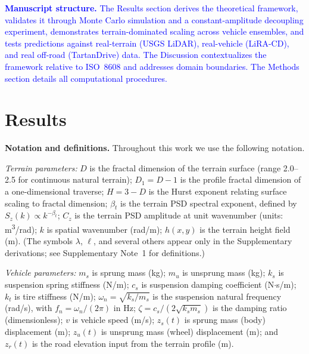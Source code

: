 \documentclass[11pt]{article}
\begin{document}
\textcolor{blue}{\textbf{Manuscript structure.} The Results section derives the theoretical framework, validates it through Monte Carlo simulation and a constant-amplitude decoupling experiment, demonstrates terrain-dominated scaling across vehicle ensembles, and tests predictions against real-terrain (USGS LiDAR), real-vehicle (LiRA-CD), and real off-road (TartanDrive) data. The Discussion contextualizes the framework relative to ISO~8608 and addresses domain boundaries. The Methods section details all computational procedures.}


\section*{Results}

\textbf{Notation and definitions.} Throughout this work we use the following notation.

\textit{Terrain parameters:} $D$ is the fractal dimension of the terrain surface (range 2.0--2.5 for continuous natural terrain); $D_1 = D - 1$ is the profile fractal dimension of a one-dimensional traverse; $H = 3-D$ is the Hurst exponent relating surface scaling to fractal dimension; $\beta_t$ is the terrain PSD spectral exponent, defined by $S_z(k) \propto k^{-\beta_t}$; $C_z$ is the terrain PSD amplitude at unit wavenumber (units: m\textsuperscript{3}/rad); $k$ is spatial wavenumber (rad/m); $h(x,y)$ is the terrain height field (m). (The symbols $\lambda$, $\ell$, and several others appear only in the Supplementary derivations; see Supplementary Note~1 for definitions.)

\textit{Vehicle parameters:} $m_s$ is sprung mass (kg); $m_u$ is unsprung mass (kg); $k_s$ is suspension spring stiffness (N/m); $c_s$ is suspension damping coefficient (N$\cdot$s/m); $k_t$ is tire stiffness (N/m); $\omega_n = \sqrt{k_s/m_s}$ is the suspension natural frequency (rad/s), with $f_n = \omega_n/(2\pi)$ in Hz; $\zeta = c_s/(2\sqrt{k_s m_s})$ is the damping ratio (dimensionless); $v$ is vehicle speed (m/s); $z_s(t)$ is sprung mass (body) displacement (m); $z_u(t)$ is unsprung mass (wheel) displacement (m); and $z_r(t)$ is the road elevation input from the terrain profile (m).
\end{document}
